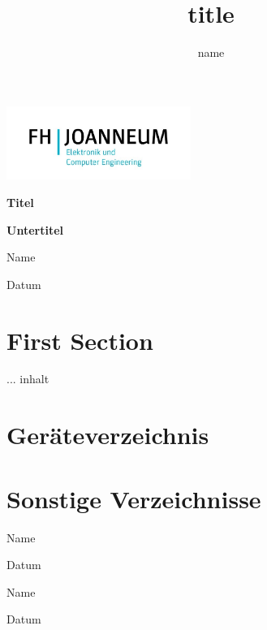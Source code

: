 \documentclass[11pt,a4paper]{article}
\title{title}
\author{name}
\begin{document}
\begin{titlepage}           %
\hfill \includegraphics[width=0.45\textwidth]{Bilder/logo.jpg}

\begin{center}
\vfill
{\huge\bf Titel}
\vspace{3em}

{\LARGE\bf Untertitel}
\vfill
\end{center}

Name

Datum
\end{titlepage}             %
\tableofcontents  

\clearpage

\section{First Section}

... inhalt 

\section{Geräteverzeichnis}

\section{Sonstige Verzeichnisse}            %

\listoftables

\listoffigures

\vspace*{\fill}             %
\begin{minipage}[b][][b]{0.3\textwidth}
\flushleft

Name

Datum
\end{minipage}
\begin{minipage}[b][][b]{0.67\textwidth}
\flushleft

Name

Datum
\end{minipage}
\end{document}
